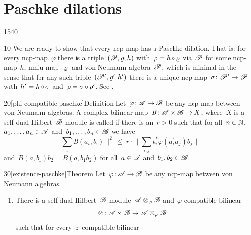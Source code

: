\section{Paschke dilations}
\begin{parsec}{1540}%
\begin{point}{10}%
We are ready to show that every ncp-map has a Paschke dilation.
    That is: for every ncp-map~$\varphi$
        there is a triple~$(\mathscr{P}, \varrho, h)$
        with~$\varphi = h \mathop{\circ} \varrho$ via~$\mathscr{P}$
            for some ncp-map~$h$, nmiu-map~$\varrho$ and von Neumann algebra~$\mathscr{P}$,
            which is minimal in the sense
            that for any such triple~$(\mathscr{P}', \varrho', h')$
            there is a unique ncp-map~$\sigma\colon \mathscr{P}' \to \mathscr{P}$
            with~$h' =h \mathop{\circ} \sigma$ and~$\varrho=\sigma\mathop{\circ}\varrho'$.
    See .
\end{point}
\begin{point}{20}[phi-compatible-paschke]{Definition}%
    Let~$\varphi\colon \mathscr{A} \to \mathscr{B}$ be any ncp-map between
        von Neumann algebras.
    A complex bilinear map~$B \colon \mathscr{A} \times \mathscr{B} \to X$,
        where~$X$ is a self-dual Hilbert~$\mathscr{B}$-module is
        called 
        if there is an~$r > 0$
        such that for all~$n\in \mathbb{N}$, $a_1, \ldots, a_n \in \mathscr{A}$
        and~$b_1, \ldots, b_n \in \mathscr{B}$ we have
        \begin{equation}
            \bigl\| \sum_i B(a_i,b_i)\bigr\|^2
             \    \leq \ r \cdot \bigl\| \sum_{i,j} b_i^* \varphi(a_i^*a_j)b_j
                \bigr\| \label{phi-compatible}
        \end{equation}
        and~$B(a,b_1)b_2 = B(a,b_1b_2)$
        for all~$a \in \mathscr{A}$ and~$b_1,b_2 \in \mathscr{B}$.
\end{point}
\begin{point}{30}[existence-paschke]{Theorem}%
    Let~$\varphi\colon \mathscr{A} \to \mathscr{B}$ be any ncp-map between
        von Neumann algebras.
\begin{enumerate}
    \item There is a self-dual Hilbert~$\mathscr{B}$-module~$\mathscr{A} \otimes_\varphi
            \mathscr{B}$ and~$\varphi$-compatible bilinear
    \begin{equation*}
        \otimes \colon \mathscr{A} \times \mathscr{B} \to \mathscr{A} \otimes_\varphi \mathscr{B}
    \end{equation*}
    such that for every~$\varphi$-compatible bilinear

\end{enumerate}
\end{point}
\end{parsec}
